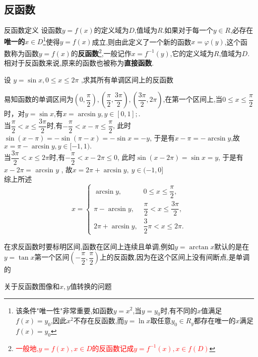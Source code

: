 \documentclass[8pt a4paper, oneside, UTF8]{ctexbook}  %
\begin{document}
\begin{sloppypar}
    \subsection{反函数}
    \begin{defn}{反函数定义}{}
        设函数$y=f(x)$的定义域为$D$,值域为$R$.如果对于每一个$y \in R $,必存在\textbf{唯一的$x \in D$}\footnote{该条件"唯一性"非常重要,如函数$y=x^2$,当$y=y_0$时,有不同的$x$值满足$f(x)=y_0$,因此$x^2$不存在反函数,而$y=\ln x$取任意$y_0 \in R_y$都存在唯一的$x$满足$f(x)=y_0$}\label{xxx1}使得$y=f(x)$成立,则由此定义了一个新的函数$x=\varphi(y)$,这个函数称为函数$y=f(x)$的\textbf{反函数}\footnote{\textcolor{red}{一般地,$y=f(x),x \in D$的反函数记成$y=f^{-1}\left(x\right),x\in f(D)$}},一般记作$x=f^{-1}(y)$,它的定义域为$R$,值域为$D$.相对于反函数来说,原来的函数也被称为\textbf{直接函数}.
    \end{defn}
    \begin{problem}{}
    设 $y=\sin x,0{\leqslant}x{\leqslant}2\pi$ ,求其所有单调区间上的反函数
    \end{problem}
    \begin{solution}
        易知函数的单调区间为$(0,\dfrac{\pi}{2}),(\dfrac{\pi}{2},\dfrac{3 \pi}{2}),(\dfrac{3\pi}{2},2\pi)$,在第一个区间上,当$0\leqslant x\leqslant\dfrac\pi2$时，对$y=\sin x$,有$x=\arcsin y,y\in[0,1];$.\\
        当$\dfrac\pi2<x\leqslant\dfrac{3\pi}2$时,有$-\dfrac\pi2<x-\pi\leqslant \dfrac\pi2$, 此时$\sin(x-\pi)=-\sin(\pi-x)=-\sin x=-y$, 于是有$x-\pi=-\arcsin y$,故$x=\pi-\arcsin y,y\in[-1,1).$\\
                    当$\dfrac{3\pi}{2}<x\leqslant 2\pi$时,有$-\dfrac\pi2<x-2\pi\leqslant0$, 此时$\sin(x-2\pi)=\sin x=y$, 于是有$x-2\pi=$ arcsin $y$ , 故$x=2\pi+\arcsin y,\:y\in(-1,0]$ \\
        综上所述$$x=\begin{cases}\arcsin y ,&0\leqslant x\leqslant\dfrac{\pi}{2} ,\\ \pi-\arcsin y ,&\dfrac{\pi}{2}<x\leqslant\dfrac{3\pi}{2} ,\\ 2\pi+\arcsin y ,&\dfrac{3}{2}\pi<x\leqslant2\pi.\end{cases}$$
    \end{solution}
    \begin{note}
        在求反函数时要标明区间,函数在区间上连续且单调,例如$y=\arctan x$默认的是在$y=\tan x$第一个区间$(-\dfrac{\pi}{2},\dfrac{\pi}{2})$上的反函数,因为在这个区间上没有间断点,是单调的
    \end{note}
    \begin{criterion}{关于反函数图像和$x,y$值转换的问题}{}

\end{criterion}
\end{sloppypar}
\end{document}
